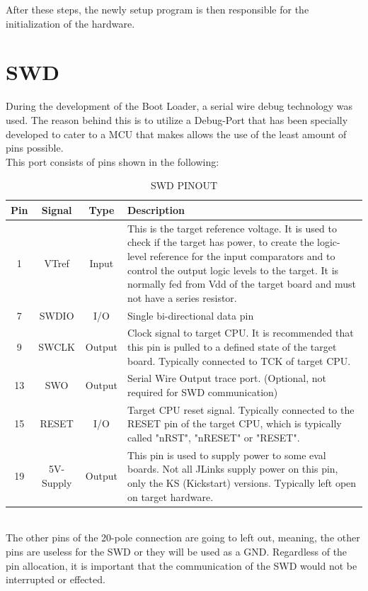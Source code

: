 After these steps, the newly setup program is then responsible for the initialization
of the hardware.\\

\section{SWD}
During the development of the Boot Loader, a serial wire debug technology was used.
The reason behind this is to utilize a Debug-Port that has been specially developed to
cater to a MCU that makes allows the use of the least amount of pins possible.\\
This port consists of pins shown in the following:\\
\begin{table}[ht]
\centering
\begin{tabular}{|c|c|c|p{10cm}|}
\hline \hline
	Pin & Signal & Type & Description \\ \hline
1 & VTref & Input & This is the target reference voltage. It is used to
 check if the target has power, to create the logic-level reference for
 the input comparators and to control the output logic levels to the target.
 It is normally fed from Vdd of the target board and must not have a series resistor.\\ \hline
7 & SWDIO & I/O & Single bi-directional data pin\\ \hline
9 & SWCLK & Output & Clock signal to target CPU. It is recommended that
 this pin is pulled to a defined state of the target board. Typically
 connected to TCK of target CPU.\\ \hline
13 & SWO & Output & Serial Wire Output trace port. (Optional, not required
for SWD communication)\\ \hline
15 & RESET & I/O & Target CPU reset signal. Typically connected to the
 RESET pin of the target CPU, which is typically called "nRST", "nRESET"
 or "RESET".\\ \hline
19 & 5V-Supply & Output & This pin is used to supply power to some eval boards.
Not all JLinks supply power on this pin, only the KS (Kickstart) versions.
Typically left open on target hardware.\\ \hline
\end{tabular}
\caption{SWD PINOUT}
\end{table}\\

The other pins of the 20-pole connection are going to left out, meaning, the other
pins are useless for the SWD or they will be used as a GND. Regardless of the pin allocation,
it is important that the communication of the SWD would not be interrupted or effected.

